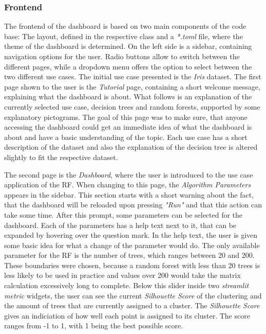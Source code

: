 \documentclass[a4paper, 12pt]{article}
\begin{document}
\subsubsection{Frontend}
The frontend of the dashboard is based on two main components of the code base: The layout, defined
in the respective class and a \textit{*.toml} file, where the theme of the dashboard is determined.
On the left side is a sidebar, containing navigation options for the user. Radio buttons allow to
switch between the different pages, while a dropdown menu offers the option to select between the
two different use cases. The initial use case presented is the \textit{Iris} dataset.
The first page shown to the user is the \textit{Tutorial} page, containing a short welcome message,
explaining what the dashboard is about. What follows is an explanation of the currently selected use
case, decision trees and random forests, supported by some explanatory pictograms.
The goal of this page was to make sure, that anyone accessing the dashboard could get an immediate
idea of what the dashboard is about and have a basic understanding of the topic. Each use case has
a short description of the dataset and also the explanation of the decision tree is altered slightly
to fit the respective dataset.
\par
The second page is the \textit{Dashboard}, where the user is introduced to the use case application
of the RF. When changing to this page, the \textit{Algorithm Parameters} appears in the sidebar. This
section starts with a short warning about the fact, that the dashboard will be reloaded upon pressing
\textit{"Run"} and that this action can take some time.
After this prompt, some parameters can be selected for the dashboard. Each of the parameters has a
help text next to it, that can be expanded by hovering over the question mark. In the help text,
the user is given some basic idea for what a change of the parameter would do.
The only available parameter for
the RF is the number of trees, which ranges between 20 and 200. These boundaries were chosen, because
a random forest with less than 20 trees is less likely to be used in practice and values over 200
would take the matrix calculation excessively long to complete.
Below this slider inside two \textit{streamlit metric} widgets, the user can see the current
\textit{Silhouette Score} \cite{rousseeuw1987silhouettes} of the clustering and the amount of trees that
are currently assigned to a cluster. The \textit{Silhouette Score} gives an indiciation of how well each
point is assigned to its cluster. The score ranges from -1 to 1, with 1 being the best possible score.
\end{document}
